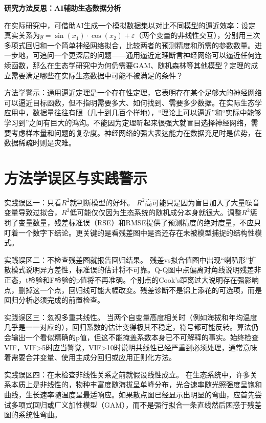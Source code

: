 \documentclass[
  twoside,12pt,fontset=none]{ctexbook}
\renewenvironment{quote}{%
  \def\FrameCommand{{\color{quote-border}\vrule width 4pt}\hspace{10pt}}%
  \MakeFramed {\advance\hsize-\width \FrameRestore\noindent\ignorespaces}%
}{%
  \endMakeFramed
}
\begin{document}
\begin{quote}
\textbf{研究方法反思：AI辅助生态数据分析}

在实际研究中，可借助AI生成一个模拟数据集以对比不同模型的逼近效率：设定真实关系为\(y = \sin(x_1) \cdot \cos(x_2) + \varepsilon\)（两个变量的非线性交互），分别用三次多项式回归和一个简单神经网络拟合，比较两者的预测精度和所需的参数数量。进一步地，可追问一个更深层的问题------通用逼近定理断言神经网络可以逼近任何连续函数，那么在生态学研究中为何仍需要GAM、随机森林等其他模型？定理的成立需要满足哪些在实际生态数据中可能不被满足的条件？

方法学警示：通用逼近定理是一个存在性定理，它表明存在某个足够大的神经网络可以逼近目标函数，但不指明需要多大、如何找到、需要多少数据。在实际生态学应用中，数据量往往有限（几十到几百个样地），``理论上可以逼近''和``实际中能够学习到''之间有巨大的鸿沟。不能因为定理听起来很强大就盲目选择神经网络，需要考虑样本量和问题的复杂度。神经网络的强大表达能力在数据充足时是优势，在数据稀疏时则是灾难。
\end{quote}

\hypertarget{ux65b9ux6cd5ux5b66ux8befux533aux4e0eux5b9eux8df5ux8b66ux793a-6}{%
\section{方法学误区与实践警示}\label{ux65b9ux6cd5ux5b66ux8befux533aux4e0eux5b9eux8df5ux8b66ux793a-6}}

实践误区一：只看\(R^2\)就判断模型的好坏。 \(R^2\)高可能只是因为盲目加入了大量噪音变量导致过拟合，\(R^2\)低可能仅仅因为生态系统的随机成分本身就很大。调整\(R^2\)惩罚了变量数量，残差标准误（RSE）和RMSE提供了预测精度的绝对度量，不应只盯着一个数字下结论。更关键的是看残差图中是否还存在未被模型捕捉的结构性模式。

实践误区二：不检查残差图就报告回归结果。 残差vs拟合值图中出现``喇叭形''扩散模式说明异方差性，标准误的估计将不可靠。Q-Q图中点偏离对角线说明残差非正态，t检验和F检验的p值将不再准确。个别点的Cook's距离过大说明存在强影响点，删掉这一个点，回归线可能大幅改变。残差诊断不是锦上添花的可选项，而是回归分析必须完成的前置检查。

实践误区三：忽视多重共线性。 当两个自变量高度相关时（例如海拔和年均温度几乎是一一对应的），回归系数的估计变得极其不稳定，符号都可能反转。算法仍会输出一个看似精确的p值，但这不能掩盖系数本身已不可解释的事实。始终检查VIF，VIF\textgreater5时应当警觉，VIF\textgreater10时说明共线性已经严重到必须处理，通常意味着需要合并变量、使用主成分回归或应用正则化方法。

实践误区四：在未检查非线性关系之前就假设线性成立。 在生态系统中，许多关系本质上是非线性的，物种丰富度随海拔呈单峰分布，光合速率随光照强度呈饱和曲线，生长速率随温度呈最适响应。如果散点图已经显示出明显的弯曲，应首先尝试多项式回归或广义加性模型（GAM），而不是强行拟合一条直线然后困惑于残差图的系统性弯曲。
\end{document}
